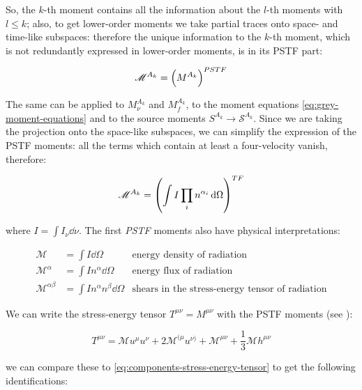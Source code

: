 \documentclass[main.tex]{subfiles}
\begin{document}
So, the \(k\)-th moment contains all the information about the \(l\)-th moments with \(l\leq k\); also, to get lower-order moments we take partial traces onto space- and time-like subspaces: therefore the unique information to the \(k\)-th moment, which is not redundantly expressed in lower-order moments, is in its PSTF part:

\begin{equation}
  \mathscr M ^{A_k} = \qty(M^{A_k}) ^{PSTF}
\end{equation}

The same can be applied to \(M^{A_k}_\nu\) and \(M^{A_k}_f\), to the moment equations \eqref{eq:grey-moment-equations} and to the source moments \(S^{A_k} \rightarrow \mathscr S ^{A_k}\). Since we are taking the projection onto the space-like subspaces, we can simplify the expression of the PSTF moments: all the terms which contain at least a four-velocity vanish, therefore:

\begin{equation} \label{eq:trace-free-moments-definition}
  \mathscr M^{A_k} = \qty(\int I \prod_i n^{\alpha_i} \dd{\Omega})^{TF}
\end{equation}

where \(I = \int I_\nu \dd{\nu}\).
The first \emph{PSTF} moments also have physical interpretations:

\begin{subequations}
\begin{align}
   \mathscr M &= \int  I \dd{\Omega}    & \text{energy density of radiation}  \\
   \mathscr M^\alpha &= \int I n^\alpha\dd{\Omega}  & \text{energy flux of radiation}  \\
   \mathscr M^{\alpha\beta} &= \int I n^\alpha n^\beta \dd{\Omega}   & \text{shears in the stress-energy tensor of radiation}
\end{align}
\end{subequations}

We can write the stress-energy tensor \(T^{\mu\nu} = M^{\mu\nu}\) with the PSTF moments (see \cite[eq. 4.9]{Thorne:1981feb}):

\begin{equation} \label{eq:PSTF-stress-energy-tensor-decomposition}
    T^{\mu\nu} = \mathscr M u^\mu u^\nu + 2 \mathscr M ^{(\mu} u^{\nu)}
    + \mathscr M ^{\mu\nu} + \frac{1}{3} \mathscr M h^{\mu\nu}
\end{equation}

we can compare these to \eqref{eq:components-stress-energy-tensor} to get the following identifications:
\end{document}
